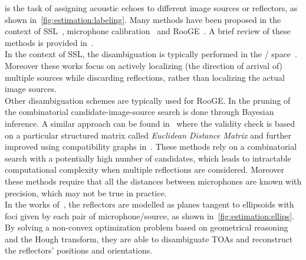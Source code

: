   is the task of assigning acoustic echoes to different image sources or reflectors, as shown in~\cref{fig:estimation:labeling}.
Many methods have been proposed in the context of \ac{SSL}~, microphone calibration~
and \ac{RooGE}~.
A brief review of these methods is provided in~.
\\In the context of \ac{SSL}, the disambiguation is typically performed in the \TDOA/ space~.
Moreover these works focus on actively localizing (the direction of arrival of) multiple sources while discarding reflections, rather than localizing the actual image sources.
\\Other disambiguation schemes are typically used for \ac{RooGE}.
In  the pruning of the combinatorial candidate-image-source search is done through Bayesian inference.
A similar approach can be found in~ where the validity check is based on a particular structured matrix called \textit{Euclidean Distance Matrix} and further improved using compatibility graphs in~.
These methods rely on a combinatorial search with a potentially high number of candidates, which leads to intractable computational complexity when multiple reflections are considered.
Moreover these methods require that all the distances between microphones are known with precision, which may not be true in practice.
\\In the works of~, the reflectors are modelled as planes tangent to ellipsoids with foci given by each pair of microphone/source, as shown in~\cref{fig:estimation:ellips}. By solving a non-convex optimization problem based on geometrical reasoning and the Hough transform, they are able to disambiguate \acp{TOA} and reconstruct the reflectors' positions and orientations.
